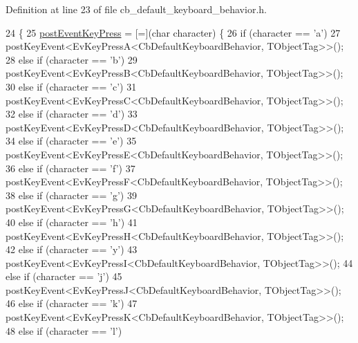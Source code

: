 Definition at line 23 of file cb\+\_\+default\+\_\+keyboard\+\_\+behavior.\+h.


\begin{DoxyCode}
24     \{
25         \hyperlink{classkeyboard__client_1_1CbDefaultKeyboardBehavior_ac3a5e8c2cca0fd4117ddc192858d3771}{postEventKeyPress} = [=](\textcolor{keywordtype}{char} character) \{
26             \textcolor{keywordflow}{if} (character == \textcolor{charliteral}{'a'})
27                 postKeyEvent<EvKeyPressA<CbDefaultKeyboardBehavior, TObjectTag>>();
28             \textcolor{keywordflow}{else} \textcolor{keywordflow}{if} (character == \textcolor{charliteral}{'b'})
29                 postKeyEvent<EvKeyPressB<CbDefaultKeyboardBehavior, TObjectTag>>();
30             \textcolor{keywordflow}{else} \textcolor{keywordflow}{if} (character == \textcolor{charliteral}{'c'})
31                 postKeyEvent<EvKeyPressC<CbDefaultKeyboardBehavior, TObjectTag>>();
32             \textcolor{keywordflow}{else} \textcolor{keywordflow}{if} (character == \textcolor{charliteral}{'d'})
33                 postKeyEvent<EvKeyPressD<CbDefaultKeyboardBehavior, TObjectTag>>();
34             \textcolor{keywordflow}{else} \textcolor{keywordflow}{if} (character == \textcolor{charliteral}{'e'})
35                 postKeyEvent<EvKeyPressE<CbDefaultKeyboardBehavior, TObjectTag>>();
36             \textcolor{keywordflow}{else} \textcolor{keywordflow}{if} (character == \textcolor{charliteral}{'f'})
37                 postKeyEvent<EvKeyPressF<CbDefaultKeyboardBehavior, TObjectTag>>();
38             \textcolor{keywordflow}{else} \textcolor{keywordflow}{if} (character == \textcolor{charliteral}{'g'})
39                 postKeyEvent<EvKeyPressG<CbDefaultKeyboardBehavior, TObjectTag>>();
40             \textcolor{keywordflow}{else} \textcolor{keywordflow}{if} (character == \textcolor{charliteral}{'h'})
41                 postKeyEvent<EvKeyPressH<CbDefaultKeyboardBehavior, TObjectTag>>();
42             \textcolor{keywordflow}{else} \textcolor{keywordflow}{if} (character == \textcolor{charliteral}{'y'})
43                 postKeyEvent<EvKeyPressI<CbDefaultKeyboardBehavior, TObjectTag>>();
44             \textcolor{keywordflow}{else} \textcolor{keywordflow}{if} (character == \textcolor{charliteral}{'j'})
45                 postKeyEvent<EvKeyPressJ<CbDefaultKeyboardBehavior, TObjectTag>>();
46             \textcolor{keywordflow}{else} \textcolor{keywordflow}{if} (character == \textcolor{charliteral}{'k'})
47                 postKeyEvent<EvKeyPressK<CbDefaultKeyboardBehavior, TObjectTag>>();
48             \textcolor{keywordflow}{else} \textcolor{keywordflow}{if} (character == \textcolor{charliteral}{'l'})

\end{DoxyCode}
